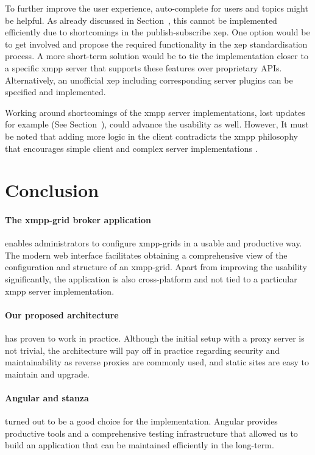 To further improve the user experience, auto-complete for users and topics might be helpful.
As already discussed in Section~, this cannot be implemented efficiently due to shortcomings in the \gls{publish-subscribe} \gls{xep}.
One option would be to get involved and propose the required functionality in the \gls{xep} standardisation process.
A more short-term solution would be to tie the implementation closer to a specific \gls{xmpp} server that supports these features over proprietary APIs.
Alternatively, an unofficial \gls{xep} including corresponding server plugins can be specified and implemented.

Working around shortcomings of the \gls{xmpp} server implementations, lost updates for example (See Section~), could advance the usability as well.
However, It must be noted that adding more logic in the client contradicts the \gls{xmpp} philosophy that encourages simple client and complex server implementations \cite{definitive-guide-xmpp}.

\section{Conclusion}
\paragraph{The \gls{xmpp-grid} \gls{broker} application} enables administrators to configure \glspl{xmpp-grid} in a usable and productive way.
The modern web interface facilitates obtaining a comprehensive view of the configuration and structure of an \gls{xmpp-grid}.
Apart from improving the usability significantly, the application is also cross-platform and not tied to a particular \gls{xmpp} server implementation.

\paragraph{Our proposed architecture} has proven to work in practice.
Although the initial setup with a proxy server is not trivial, the architecture will pay off in practice regarding security and maintainability as reverse proxies are commonly used, and static sites are easy to maintain and upgrade.

\paragraph{Angular and stanza} turned out to be a good choice for the implementation.
Angular provides productive tools and a comprehensive testing infrastructure that allowed us to build an application that can be maintained efficiently in the long-term.

